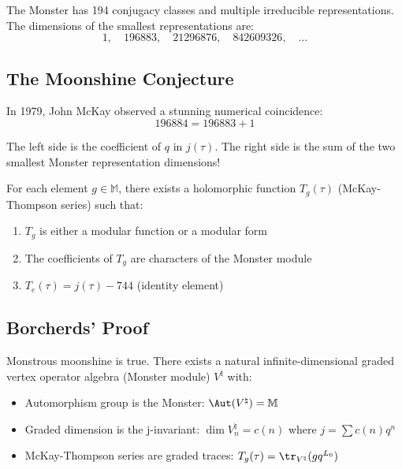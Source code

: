 The Monster has 194 conjugacy classes and multiple irreducible representations. The dimensions of the smallest representations are:
\begin{equation}
    1, \quad 196883, \quad 21296876, \quad 842609326, \quad \ldots
\end{equation}

\subsection{The Moonshine Conjecture}

In 1979, John McKay observed a stunning numerical coincidence:
\begin{equation}
    196884 = 196883 + 1
\end{equation}

The left side is the coefficient of $q$ in $j(\tau)$. The right side is the sum of the two smallest Monster representation dimensions!

\begin{theorem}
For each element $g \in \mathbb{M}$, there exists a holomorphic function $T_g(\tau)$ (McKay-Thompson series) such that:
\begin{enumerate}
    \item $T_g$ is either a modular function or a modular form
    \item The coefficients of $T_g$ are characters of the Monster module
    \item $T_e(\tau) = j(\tau) - 744$ (identity element)
\end{enumerate}
\end{theorem}

\subsection{Borcherds' Proof}

\begin{theorem}
Monstrous moonshine is true. There exists a natural infinite-dimensional graded vertex operator algebra (Monster module) $V^{\natural}$ with:
\begin{itemize}
    \item Automorphism group is the Monster: $\Aut(V^{\natural}) = \mathbb{M}$
    \item Graded dimension is the j-invariant: $\dim V^{\natural}_n = c(n)$ where $j = \sum c(n) q^n$
    \item McKay-Thompson series are graded traces: $T_g(\tau) = \tr_{V^{\natural}}(g q^{L_0})$
\end{itemize}
\end{theorem}

